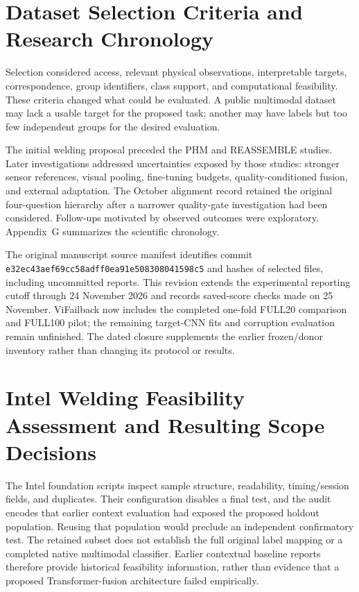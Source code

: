 \section{Dataset Selection Criteria and Research Chronology}
Selection considered access, relevant physical observations, interpretable targets, correspondence, group identifiers, class support, and computational feasibility. These criteria changed what could be evaluated. A public multimodal dataset may lack a usable target for the proposed task; another may have labels but too few independent groups for the desired evaluation.

The initial welding proposal preceded the PHM and REASSEMBLE studies. Later investigations addressed uncertainties exposed by those studies: stronger sensor references, visual pooling, fine-tuning budgets, quality-conditioned fusion, and external adaptation. The October alignment record retained the original four-question hierarchy after a narrower quality-gate investigation had been considered. Follow-ups motivated by observed outcomes were exploratory. Appendix~G summarizes the scientific chronology.

The original manuscript source manifest identifies commit \texttt{e32ec43aef69cc58adff0ea91e508308041598c5} and hashes of selected files, including uncommitted reports. This revision extends the experimental reporting cutoff through 24 November 2026 and records saved-score checks made on 25 November. ViFailback now includes the completed one-fold FULL20 comparison and FULL100 pilot; the remaining target-CNN fits and corruption evaluation remain unfinished. The dated closure supplements the earlier frozen/donor inventory rather than changing its protocol or results.

\section{Intel Welding Feasibility Assessment and Resulting Scope Decisions}
The Intel foundation scripts inspect sample structure, readability, timing/session fields, and duplicates. Their configuration disables a final test, and the audit encodes that earlier context evaluation had exposed the proposed holdout population. Reusing that population would preclude an independent confirmatory test. The retained subset does not establish the full original label mapping or a completed native multimodal classifier. Earlier contextual baseline reports therefore provide historical feasibility information, rather than evidence that a proposed Transformer-fusion architecture failed empirically.

